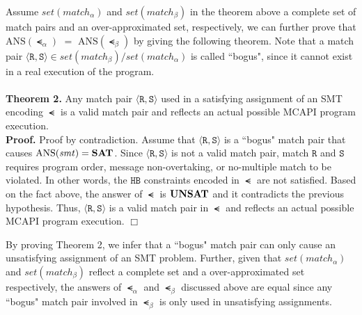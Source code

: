 Assume $\mathit{set(match_{\alpha})}$ and $\mathit{set(match_{\beta})}$ in the theorem above a complete set of match pairs and an over-approximated set, respectively, we can further prove that $\mathrm{ANS}(\smt_{\alpha})$ $ = $ $\mathrm{ANS}(\smt_{\beta})$ by giving the following theorem. Note that a match pair $\langle \mathtt{R},\mathtt{S}\rangle \in \mathit{set(match_{\beta})}/\mathit{set(match_{\alpha})}$ is called ``bogus", since it cannot exist in a real execution of the program.
\\
\\
\textbf{Theorem 2.}
Any match pair $\langle \mathtt{R}, \mathtt{S}\rangle$ used in a satisfying assignment of an SMT encoding $\smt$ is a valid match pair and reflects an actual possible MCAPI program execution.
\\
\textbf{Proof.}
Proof by contradiction. Assume that $\langle \mathtt{R}, \mathtt{S}\rangle$ is a ``bogus" match pair that causes $\mathrm{ANS}(\mathit{smt}) = \textbf{SAT}$. Since $\langle \mathtt{R}, \mathtt{S}\rangle$ is not a valid match pair, match $\mathtt{R}$ and $\mathtt{S}$ requires program order, message non-overtaking, or no-multiple match to be violated. In other words, the $\mathtt{HB}$ constraints encoded in $\smt$ are not satisfied. Based on the fact above, the answer of $\smt$ is $\textbf{UNSAT}$ and it contradicts the previous hypothesis. Thus, $\langle \mathtt{R}, \mathtt{S}\rangle$ is a valid match pair in $\smt$ and reflects an actual possible MCAPI program execution. $\Box$


By proving Theorem 2, we infer that a ``bogus" match pair can only cause an unsatisfying assignment of an SMT problem. Further, given that $\mathit{set(match_{\alpha})}$ and $\mathit{set(match_{\beta})}$ reflect a complete set and a over-approximated set respectively, the answers of $\smt_{\alpha}$ and $\smt_{\beta}$ discussed above are equal since any ``bogus" match pair involved in $\smt_{\beta}$ is only used in unsatisfying assignments.











